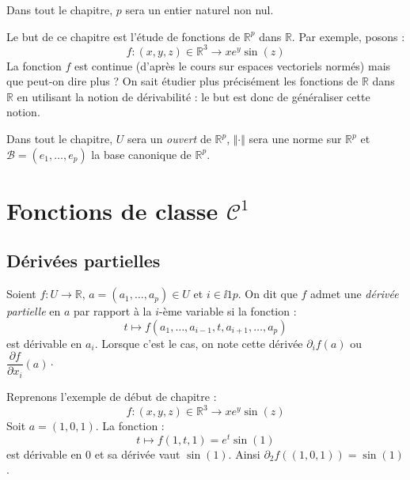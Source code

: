 \documentclass[french,11pt,twoside]{VcCours}
\begin{document}

\tableofcontents
\separationTitre


Dans tout le chapitre, $p$ sera un entier naturel non nul.

\medskip

Le but de ce chapitre est l'étude de fonctions de $\mathbb{R}^p$ dans $\mathbb{R}$. Par exemple, posons :
$$ f : (x,y,z) \in \mathbb{R}^3 \rightarrow xe^y\sin(z) $$ 
La fonction $f$ est continue (d'après le cours sur espaces vectoriels normés) mais que peut-on dire plus ? On sait étudier plus précisément les fonctions de $\mathbb{R}$ dans $\mathbb{R}$ en utilisant la notion de dérivabilité : le but est donc de généraliser cette notion.

\medskip

Dans tout le chapitre, $U$ sera un \emph{ouvert} de $\mathbb{R}^p$, $\Vert \cdot \Vert$ sera une norme sur $\mathbb{R}^p$ et $\mathcal{B}= (e_1, \ldots, e_p)$ la base canonique de $\mathbb{R}^p$.

\newpage
\section{Fonctions de classe \texorpdfstring{$\mathcal{C}^1$}{C¹}}
\subsection{Dérivées partielles}
\begin{Definition}{} Soient $f : U \rightarrow \mathbb{R}$, $a =(a_1, \ldots, a_p) \in U$ et $i \in \ii{1}{p}$. On dit que $f$ admet une \emph{dérivée partielle} en $a$ par rapport à la $i$-ème variable si la fonction :
$$ t \mapsto f(a_1, \ldots, a_{i-1}, t, a_{i+1}, \ldots, a_p) $$
est dérivable en $a_i$. Lorsque c'est le cas, on note cette dérivée $\partial_i f(a)$ ou $\dfrac{\partial f}{\partial x_i }(a)\cdot$
\end{Definition}



\begin{Exemple}{} Reprenons l'exemple de début de chapitre : 
 $$f : (x,y,z) \in \mathbb{R}^3 \rightarrow xe^y\sin(z)$$
Soit $a=(1,0,1)$. La fonction :
$$ t \mapsto f(1,t,1) = e^t \sin(1)$$
est dérivable en $0$ et sa dérivée vaut $\sin(1)$. Ainsi $\partial_2 f((1,0,1))=\sin(1)$.
\end{Exemple}

\medskip
\end{document}
